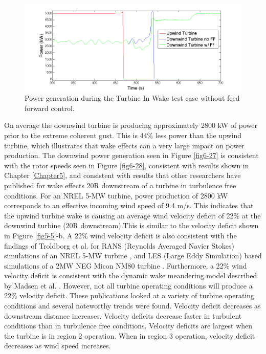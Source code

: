 \begin{figure}[ht] 
	\centering
		\includegraphics[width = \linewidth]{Figures/ch6Figures/fig6-29.png}

	\caption{Power generation during the Turbine In Wake test case without feed forward control.}
	\label{fig6-29}
\end{figure}

On average the downwind turbine is producing approximately 2800 kW of power prior to the extreme coherent gust. This is 44\% less power than the upwind turbine, which illustrates that wake effects can a very large impact on power production. The downwind power generation seen in Figure \ref{fig6-27} is consistent with the rotor speeds seen in Figure \ref{fig6-28}, consistent with results shown in Chapter \ref{Chapter5}, and consistent with results that other researchers have published for wake effects 20R downstream of a turbine in turbulence free conditions. For an NREL 5-MW turbine, power production of 2800 kW corresponds to an effective incoming wind speed of 9.4 m/s. This indicates that the upwind turbine wake is causing an average wind velocity deficit of 22\%  at the downwind turbine (20R downstream).This is similar to the velocity deficit shown in Figure \ref{fig5-5}-b. A 22\% wind velocity deficit is also consistent with the findings of Troldborg et al. for RANS (Reynolds Averaged Navier Stokes) simulations of an NREL 5-MW turbine \cite{troldborg2015}, and LES (Large Eddy Simulation) based simulations of a 2MW NEG Micon NM80 turbine \cite{troldborg2010,troldborg2010b}. Furthermore, a 22\% wind velocity deficit is consistent with the dynamic wake meandering model described by Madsen et al. \cite{madsen2010}. However, not all turbine operating conditions will produce a 22\% velocity deficit. These publications looked at a variety of turbine operating conditions and several noteworthy trends were found. Velocity deficit decreases as downstream distance increases. Velocity deficits decrease faster in turbulent conditions than in turbulence free conditions. Velocity deficits are largest when the turbine is in region 2 operation. When in region 3 operation, velocity deficit decreases as wind speed increases.


